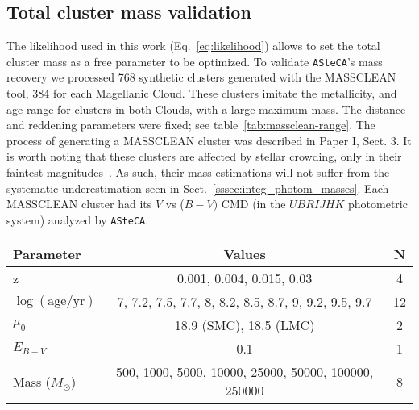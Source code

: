 \documentclass[draft]{aa}
\begin{document}
\begin{appendix}

\section{Total cluster mass validation}
\label{apdx:mass_valid}

The likelihood used in this work (Eq.~\ref{eq:likelihood}) allows
to set the total cluster mass as a free parameter to be optimized.
To validate \texttt{ASteCA}'s mass recovery we processed 768 synthetic
clusters generated with the MASSCLEAN tool, 384 for each Magellanic Cloud.
%
These clusters imitate the metallicity, and age range for clusters in
both Clouds, with a large maximum mass. The distance and reddening parameters
were fixed; see table~\ref{tab:massclean-range}.
The process of generating a MASSCLEAN cluster was described in Paper I, Sect. 3.
It is worth noting that these clusters are affected by stellar crowding,
only in their faintest magnitudes~\citep[using a theoretical
completeness function similar to that presented in][]{Small_2013}. As such,
their mass estimations will not suffer from the systematic underestimation seen
in Sect.~\ref{sssec:integ_photom_masses}.
%
Each MASSCLEAN cluster had its $V$ vs ($B-V)$ CMD (in the $UBRIJHK$ photometric
system) analyzed by \texttt{ASteCA}.

\begin{table*}
\centering
\caption{Parameter values used to generate the set of 768 MASSCLEAN clusters.}
\label{tab:massclean-range}
\begin{tabular}{lcc}
\hline\hline
 Parameter & Values & N\\
\hline
z & 0.001, 0.004, 0.015, 0.03 & 4\\
$\log\mathrm{(age/yr)}$ & 7, 7.2, 7.5, 7.7, 8, 8.2, 8.5, 8.7, 9, 9.2, 9.5, 9.7 &
12\\
$\mu_0$ & 18.9 (SMC), 18.5 (LMC) & 2\\
$E_{B-V}$ & 0.1 & 1\\
Mass ($M_{\odot}$) & 500, 1000, 5000, 10000, 25000, 50000, 100000, 250000 & 8\\
\hline
\end{tabular}
\end{table*}


\end{appendix}
\end{document}

